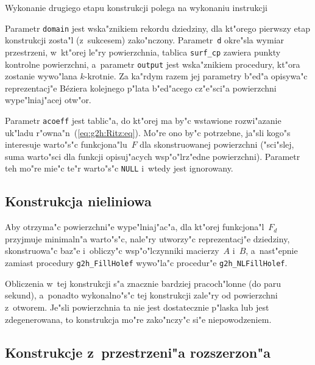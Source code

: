 \vspace{\medskipamount}
Wykonanie drugiego etapu konstrukcji polega na wykonaniu instrukcji

\vspace{\medskipamount}

\vspace{\medskipamount}
Parametr \texttt{domain} jest wska"znikiem rekordu dziedziny, dla kt"orego
pierwszy etap konstrukcji zosta"l (z~sukcesem) zako"nczony. Parametr~\texttt{d}
okre"sla wymiar przestrzeni, w~kt"orej le"ry powierzchnia, tablica
\texttt{surf\_cp} zawiera punkty kontrolne powierzchni, a~parametr
\texttt{output} jest wska"znikiem procedury, kt"ora zostanie wywo"lana
$k$-krotnie. Za ka"rdym razem jej parametry b"ed"a opisywa"c reprezentacj"e
B\'{e}ziera kolejnego p"lata b"ed"acego cz"e"sci"a powierzchni wype"lniaj"acej
otw"or.

Parametr \texttt{acoeff} jest tablic"a, do kt"orej ma by"c wstawione
rozwi"azanie uk"ladu r"owna"n~(\ref{eq:g2h:Ritz:eq}). Mo"re ono by"c
potrzebne, ja"sli kogo"s interesuje warto"s"c funkcjona"lu~$F$
dla skonstruowanej powierzchni ("sci"slej, suma warto"sci dla funkcji
opisuj"acych wsp"o"lrz"edne powierzchni). Parametr teh mo"re mie"c
te"r warto"s"c \texttt{NULL} i~wtedy jest ignorowany.


\subsection{Konstrukcja nieliniowa}

Aby otrzyma"c powierzchni"e wype"lniaj"ac"a, dla kt"orej funkcjona"l~$F_d$
przyjmuje minimaln"a warto"s"c, nale"ry utworzy"c reprezentacj"e dziedziny,
skonstruowa"c baz"e i~obliczy"c wsp"o"lczynniki macierzy~$A$ i~$B$,
a~nast"epnie zamiast procedury \texttt{g2h\_FillHolef} wywo"la"c procedur"e
\texttt{g2h\_NLFillHolef}.

Obliczenia w~tej konstrukcji s"a znacznie bardziej pracoch"lonne (do paru
sekund), a~ponadto wykonalno"s"c tej konstrukcji zale"ry od powierzchni
z~otworem. Je"sli powierzchnia ta nie jest dostatecznie p"laska lub jest
zdegenerowana, to konstrukcja mo"re zako"nczy"c si"e niepowodzeniem.


\subsection{Konstrukcje z~przestrzeni"a rozszerzon"a}

